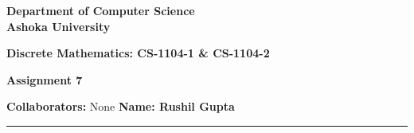 \documentclass[a4paper]{article}
\begin{document}
\begin{center}
{\large \bf \color{red}  Department of Computer Science} \\
{\large \bf \color{red}  Ashoka University} \\

\vspace{0.1in}

{\large \bf \color{blue}  Discrete Mathematics: CS-1104-1 \& CS-1104-2}

\vspace{0.05in}

    { \bf \color{YellowOrange} Assignment 7}
\end{center}
\medskip

{\textbf{Collaborators:} None} \hfill {\textbf{Name: Rushil Gupta} }

\bigskip
\hrule
\end{document}
